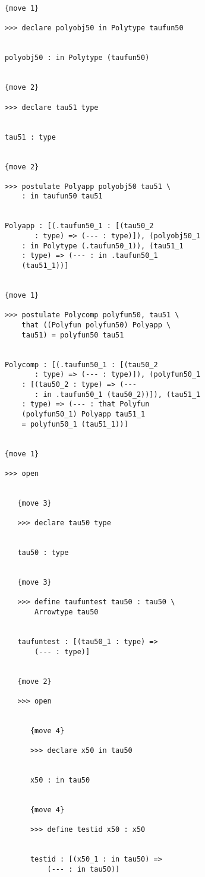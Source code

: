 \documentclass[12pt]{article}
\begin{document}
\begin{verbatim}
      {move 1}

      >>> declare polyobj50 in Polytype taufun50


      polyobj50 : in Polytype (taufun50)


      {move 2}

      >>> declare tau51 type


      tau51 : type


      {move 2}

      >>> postulate Polyapp polyobj50 tau51 \
          : in taufun50 tau51


      Polyapp : [(.taufun50_1 : [(tau50_2 
             : type) => (--- : type)]), (polyobj50_1 
          : in Polytype (.taufun50_1)), (tau51_1 
          : type) => (--- : in .taufun50_1 
          (tau51_1))]


      {move 1}

      >>> postulate Polycomp polyfun50, tau51 \
          that ((Polyfun polyfun50) Polyapp \
          tau51) = polyfun50 tau51


      Polycomp : [(.taufun50_1 : [(tau50_2 
             : type) => (--- : type)]), (polyfun50_1 
          : [(tau50_2 : type) => (--- 
             : in .taufun50_1 (tau50_2))]), (tau51_1 
          : type) => (--- : that Polyfun 
          (polyfun50_1) Polyapp tau51_1 
          = polyfun50_1 (tau51_1))]


      {move 1}

      >>> open


         {move 3}

         >>> declare tau50 type


         tau50 : type


         {move 3}

         >>> define taufuntest tau50 : tau50 \
             Arrowtype tau50


         taufuntest : [(tau50_1 : type) => 
             (--- : type)]


         {move 2}

         >>> open


            {move 4}

            >>> declare x50 in tau50


            x50 : in tau50


            {move 4}

            >>> define testid x50 : x50


            testid : [(x50_1 : in tau50) => 
                (--- : in tau50)]



\end{verbatim}
\end{document}
